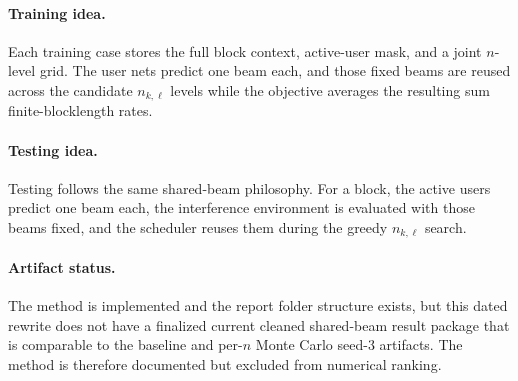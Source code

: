 \documentclass[11pt]{article}
\begin{document}
\paragraph{Training idea.}
Each training case stores the full block context, active-user mask, and a joint \(n\)-level grid. The user nets predict one beam each, and those fixed beams are reused across the candidate \(n_{k,\ell}\) levels while the objective averages the resulting sum finite-blocklength rates.

\paragraph{Testing idea.}
Testing follows the same shared-beam philosophy. For a block, the active users predict one beam each, the interference environment is evaluated with those beams fixed, and the scheduler reuses them during the greedy \(n_{k,\ell}\) search.

\paragraph{Artifact status.}
The method is implemented and the report folder structure exists, but this dated rewrite does not have a finalized current cleaned shared-beam result package that is comparable to the baseline and per-\(n\) Monte Carlo seed-3 artifacts. The method is therefore documented but excluded from numerical ranking.
\end{document}
